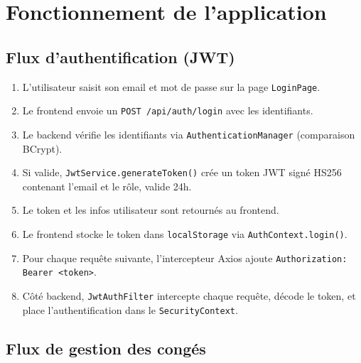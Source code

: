 \documentclass[a4paper,12pt]{report}
\begin{document}
\chapter{Fonctionnement de l'application}

\section{Flux d'authentification (JWT)}

\begin{enumerate}
  \item L'utilisateur saisit son email et mot de passe sur la page \texttt{LoginPage}.
  \item Le frontend envoie un \texttt{POST /api/auth/login} avec les identifiants.
  \item Le backend vérifie les identifiants via \texttt{AuthenticationManager} (comparaison BCrypt).
  \item Si valide, \texttt{JwtService.generateToken()} crée un token JWT signé HS256 contenant l'email et le rôle, valide 24h.
  \item Le token et les infos utilisateur sont retournés au frontend.
  \item Le frontend stocke le token dans \texttt{localStorage} via \texttt{AuthContext.login()}.
  \item Pour chaque requête suivante, l'intercepteur Axios ajoute \texttt{Authorization: Bearer <token>}.
  \item Côté backend, \texttt{JwtAuthFilter} intercepte chaque requête, décode le token, et place l'authentification dans le \texttt{SecurityContext}.
\end{enumerate}

\section{Flux de gestion des congés}
\end{document}
